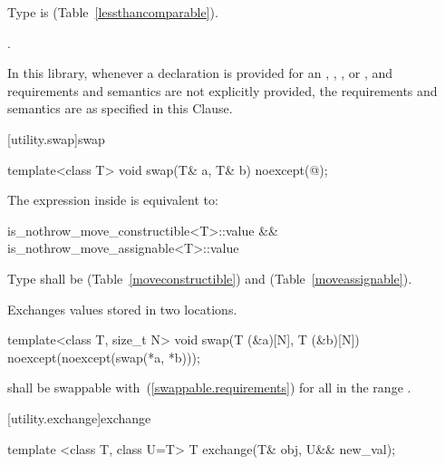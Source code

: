 \begin{itemdescr}
\pnum
\requires
Type  is  (Table~\ref{lessthancomparable}).

\pnum
\returns
{}.
\end{itemdescr}

\pnum
In this library, whenever a declaration is provided for an ,
, , or ,
and requirements and semantics are not explicitly provided,
the requirements and semantics are as specified in this Clause.

[utility.swap]{swap}

%
\begin{itemdecl}
template<class T> void swap(T& a, T& b) noexcept(@\seebelow@);
\end{itemdecl}

\begin{itemdescr}
\pnum
\remark The expression inside  is equivalent to:

\begin{codeblock}
is_nothrow_move_constructible<T>::value &&
is_nothrow_move_assignable<T>::value
\end{codeblock}

\pnum
\requires
Type
shall be
 (Table~\ref{moveconstructible})
and
 (Table~\ref{moveassignable}).

\pnum
\effects
Exchanges values stored in two locations.
\end{itemdescr}

%
\begin{itemdecl}
template<class T, size_t N>
  void swap(T (&a)[N], T (&b)[N]) noexcept(noexcept(swap(*a, *b)));
\end{itemdecl}

\begin{itemdescr}
\pnum
\requires
{} shall be swappable with~(\ref{swappable.requirements}) 
for all  in the range .

\pnum
\effects {}
\end{itemdescr}

[utility.exchange]{exchange}

\begin{itemdecl}
template <class T, class U=T> T exchange(T& obj, U&& new_val);
\end{itemdecl}

